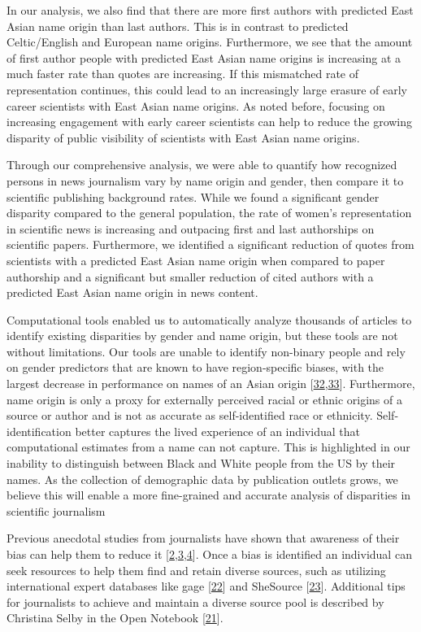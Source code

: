 In our analysis, we also find that there are more first authors with predicted East Asian name origin than last authors.
This is in contrast to predicted Celtic/English and European name origins.
Furthermore, we see that the amount of first author people with predicted East Asian name origins is increasing at a much faster rate than quotes are increasing.
If this mismatched rate of representation continues, this could lead to an increasingly large erasure of early career scientists with East Asian name origins.
As noted before, focusing on increasing engagement with early career scientists can help to reduce the growing disparity of public visibility of scientists with East Asian name origins.

Through our comprehensive analysis, we were able to quantify how recognized persons in news journalism vary by name origin and gender, then compare it to scientific publishing background rates.
While we found a significant gender disparity compared to the general population, the rate of women's representation in scientific news is increasing and outpacing first and last authorships on scientific papers.
Furthermore, we identified a significant reduction of quotes from scientists with a predicted East Asian name origin when compared to paper authorship and a significant but smaller reduction of cited authors with a predicted East Asian name origin in news content.

Computational tools enabled us to automatically analyze thousands of articles to identify existing disparities by gender and name origin, but these tools are not without limitations.
Our tools are unable to identify non-binary people and rely on gender predictors that are known to have region-specific biases, with the largest decrease in performance on names of an Asian origin {[}\protect\hyperlink{ref-ODb9u77d}{32},\protect\hyperlink{ref-8CuPqphs}{33}{]}.
Furthermore, name origin is only a proxy for externally perceived racial or ethnic origins of a source or author and is not as accurate as self-identified race or ethnicity.
Self-identification better captures the lived experience of an individual that computational estimates from a name can not capture.
This is highlighted in our inability to distinguish between Black and White people from the US by their names.
As the collection of demographic data by publication outlets grows, we believe this will enable a more fine-grained and accurate analysis of disparities in scientific journalism

Previous anecdotal studies from journalists have shown that awareness of their bias can help them to reduce it {[}\protect\hyperlink{ref-CR5YHhw8}{2},\protect\hyperlink{ref-gud4dlat}{3},\protect\hyperlink{ref-soMuDIhH}{4}{]}.
Once a bias is identified an individual can seek resources to help them find and retain diverse sources, such as utilizing international expert databases like gage {[}\protect\hyperlink{ref-TPNkhIbZ}{22}{]} and SheSource {[}\protect\hyperlink{ref-1CFcA44h9}{23}{]}.
Additional tips for journalists to achieve and maintain a diverse source pool is described by Christina Selby in the Open Notebook {[}\protect\hyperlink{ref-11fb3ccQ4}{21}{]}.


